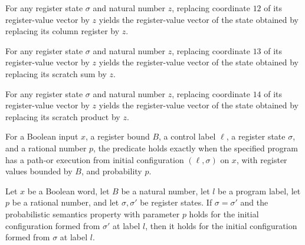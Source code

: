 \begin{lemma}
\label{Complexity.LogProg.UReg.u_12}
\leanok
{}
For any register state $\sigma$ and natural number $z$, replacing coordinate $12$ of its
register-value vector by $z$ yields the register-value vector of the state obtained by
replacing its column register by $z$.
\end{lemma}

\begin{lemma}
\label{Complexity.LogProg.UReg.u_13}
\leanok
{}
For any register state $\sigma$ and natural number $z$, replacing coordinate $13$ of its
register-value vector by $z$ yields the register-value vector of the state obtained by
replacing its scratch sum by $z$.
\end{lemma}

\begin{lemma}
\label{Complexity.LogProg.UReg.u_14}
\leanok
{}
For any register state $\sigma$ and natural number $z$, replacing coordinate $14$ of its
register-value vector by $z$ yields the register-value vector of the state obtained by
replacing its scratch product by $z$.
\end{lemma}

\begin{definition}
\label{Complexity.LogProg.UPS}
\leanok
{}
For a Boolean input $x$, a register bound $B$, a control label $\ell$, a register state
$\sigma$, and a rational number $p$, the predicate holds exactly when the specified
program has a path-or execution from initial configuration $(\ell,\sigma)$ on $x$, with
register values bounded by $B$, and probability $p$.
\end{definition}

\begin{lemma}
\label{Complexity.LogProg.UPS.of_eq}
\leanok
{}
Let $x$ be a Boolean word, let $B$ be a natural number, let $l$ be a program label, let
$p$ be a rational number, and let $\sigma,\sigma'$ be register states. If
$\sigma=\sigma'$ and the probabilistic semantics property with parameter $p$ holds for
the initial configuration formed from $\sigma'$ at label $l$, then it holds for the
initial configuration formed from $\sigma$ at label $l$.
\end{lemma}
